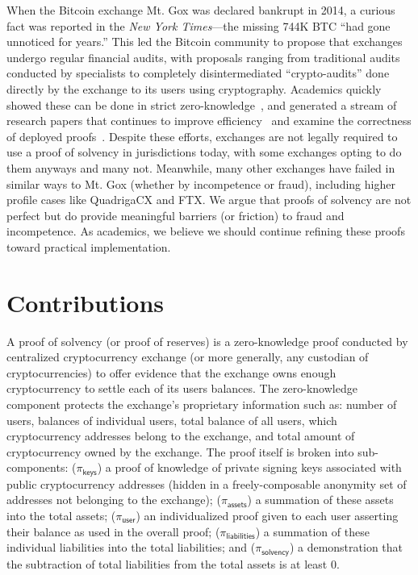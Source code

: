 When the Bitcoin exchange Mt. Gox was declared bankrupt in 2014, a curious fact was reported in the \textit{New York Times}---the missing 744K BTC ``had gone unnoticed for years.'' This led the Bitcoin community to propose that exchanges undergo regular financial audits, with proposals ranging from traditional audits conducted by specialists to completely disintermediated ``crypto-audits'' done directly by the exchange to its users using cryptography. Academics quickly showed these can be done in strict zero-knowledge~\cite{provisions}, and generated a stream of research papers that continues to improve efficiency~\cite{bulletproofs,zeroledge,dapol,spp,notus,izpr} and examine the correctness of deployed proofs~\cite{broken}. Despite these efforts, exchanges are not legally required to use a proof of solvency in jurisdictions today, with some exchanges opting to do them anyways and many not. Meanwhile, many other exchanges have failed in similar ways to Mt. Gox (whether by incompetence or fraud), including higher profile cases like QuadrigaCX and FTX. We argue that proofs of solvency are not perfect but do provide meaningful barriers (or friction) to fraud and incompetence. As academics, we believe we should continue refining these proofs toward practical implementation.  


\section{Contributions}

A proof of solvency (or proof of reserves) is a zero-knowledge proof conducted by centralized cryptocurrency exchange (or more generally, any custodian of cryptocurrencies) to offer evidence that the exchange owns enough cryptocurrency to settle each of its users balances. The zero-knowledge component protects the exchange's proprietary information such as: number of users, balances of individual users, total balance of all users, which cryptocurrency addresses belong to the exchange, and total amount of cryptocurrency owned by the exchange. The proof itself is broken into sub-components: ($\pi_\mathsf{keys}$) a proof of knowledge of private signing keys associated with public cryptocurrency addresses (hidden in a freely-composable anonymity set of addresses not belonging to the exchange); ($\pi_\mathsf{assets}$) a summation of these assets into the total assets; ($\pi_\mathsf{user}$) an individualized proof given to each user asserting their balance as used in the overall proof; ($\pi_\mathsf{liabilities}$) a summation of these individual liabilities into the total liabilities; and ($\pi_\mathsf{solvency}$) a demonstration that the subtraction of total liabilities from the total assets is at least 0.

